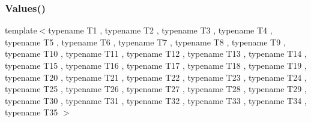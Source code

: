 \subsubsection{\texorpdfstring{Values()}{Values()}\hspace{0.1cm}{\footnotesize\ttfamily [36/51]}}
{\footnotesize\ttfamily template$<$typename T1 , typename T2 , typename T3 , typename T4 , typename T5 , typename T6 , typename T7 , typename T8 , typename T9 , typename T10 , typename T11 , typename T12 , typename T13 , typename T14 , typename T15 , typename T16 , typename T17 , typename T18 , typename T19 , typename T20 , typename T21 , typename T22 , typename T23 , typename T24 , typename T25 , typename T26 , typename T27 , typename T28 , typename T29 , typename T30 , typename T31 , typename T32 , typename T33 , typename T34 , typename T35 $>$ \\
}
